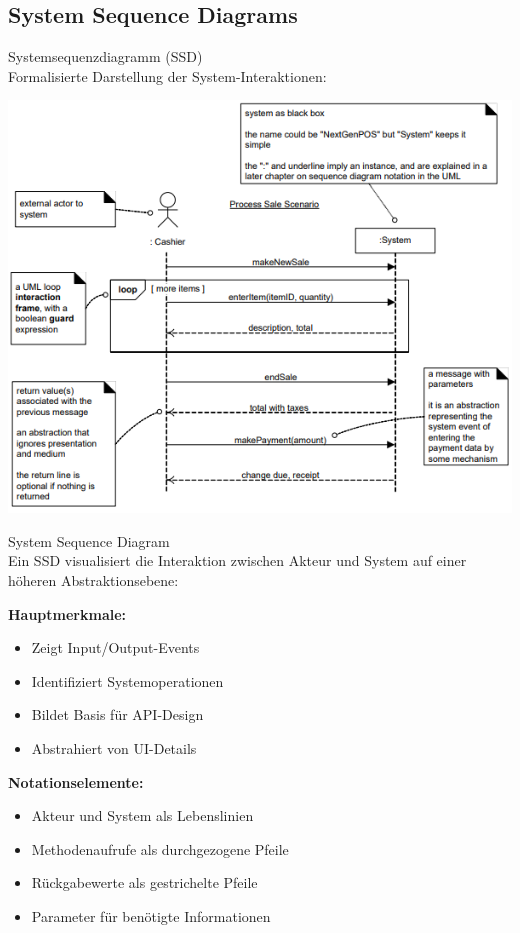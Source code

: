 \pagebreak

\subsection{System Sequence Diagrams}

\begin{definition}{Systemsequenzdiagramm (SSD)}\\
Formalisierte Darstellung der System-Interaktionen:

\includegraphics[width=\linewidth]{ssed.png}
\end{definition}

\begin{concept}{System Sequence Diagram}\\
Ein SSD visualisiert die Interaktion zwischen Akteur und System auf einer höheren Abstraktionsebene:

\textbf{Hauptmerkmale:}
\begin{itemize}
    \item Zeigt Input/Output-Events
    \item Identifiziert Systemoperationen
    \item Bildet Basis für API-Design
    \item Abstrahiert von UI-Details
\end{itemize}

\textbf{Notationselemente:}
\begin{itemize}
    \item Akteur und System als Lebenslinien
    \item Methodenaufrufe als durchgezogene Pfeile
    \item Rückgabewerte als gestrichelte Pfeile
    \item Parameter für benötigte Informationen
\end{itemize}
\end{concept}

